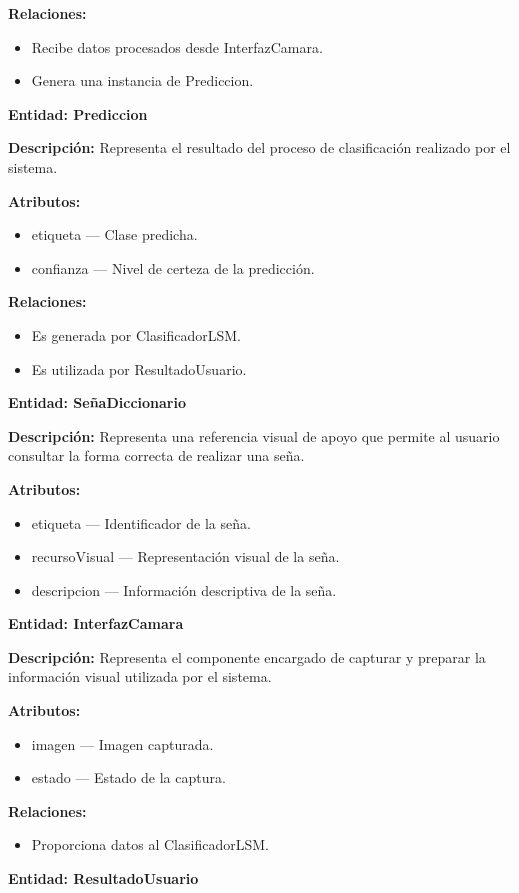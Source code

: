 	\textbf{Relaciones:}
	\begin{itemize}
		\item Recibe datos procesados desde InterfazCamara.
		\item Genera una instancia de Prediccion.
	\end{itemize}
	
	\textbf{Entidad: Prediccion}
	
	\textbf{Descripción:} Representa el resultado del proceso de clasificación realizado por el sistema.
	
	\textbf{Atributos:}
	\begin{itemize}
		\item etiqueta — Clase predicha.
		\item confianza — Nivel de certeza de la predicción.
	\end{itemize}
	
	\textbf{Relaciones:}
	\begin{itemize}
		\item Es generada por ClasificadorLSM.
		\item Es utilizada por ResultadoUsuario.
	\end{itemize}
	
	\textbf{Entidad: SeñaDiccionario}
	
	\textbf{Descripción:} Representa una referencia visual de apoyo que permite al usuario consultar la forma correcta de realizar una seña.
	
	\textbf{Atributos:}
	\begin{itemize}
		\item etiqueta — Identificador de la seña.
		\item recursoVisual — Representación visual de la seña.
		\item descripcion — Información descriptiva de la seña.
	\end{itemize}
	\textbf{Entidad: InterfazCamara}
	
	\textbf{Descripción:} Representa el componente encargado de capturar y preparar la información visual utilizada por el sistema.
	
	\textbf{Atributos:}
	\begin{itemize}
		\item imagen — Imagen capturada.
		\item estado — Estado de la captura.
	\end{itemize}
	
	\textbf{Relaciones:}
	\begin{itemize}
		\item Proporciona datos al ClasificadorLSM.
	\end{itemize}
	\textbf{Entidad: ResultadoUsuario}
	
